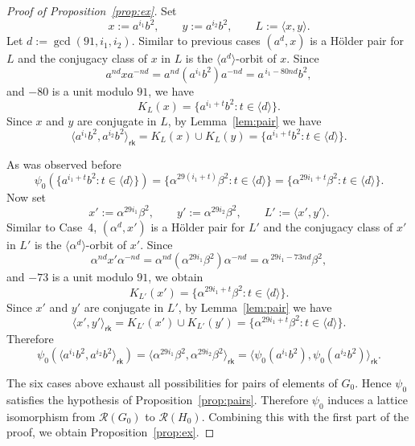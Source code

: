 \documentclass[10pt,a4paper]{amsart}
\begin{document}
\begin{proof}[Proof of Proposition~\ref{prop:ex}]
  \medskip
  Set
  $$ x:=a^{i_1}b^2,\qquad y:=a^{i_2}b^2,\qquad L:=\langle x,y\rangle. $$
  Let $d:=\gcd(91,i_1,i_2)$. Similar to previous cases $(a^d,x)$ is a Hölder pair for $L$ and the conjugacy class of $x$ in $L$ is the $\langle a^d\rangle$-orbit of $x$. Since
  $$ a^{nd}xa^{-nd}=a^{nd}(a^{i_1}b^2)a^{-nd}=a^{\,i_1-80nd}b^2, $$
  and $-80$ is a unit modulo $91$, we have
  $$ K_L(x)=\{a^{i_1+t}b^2:t\in \langle d\rangle\}. $$
  Since $x$ and $y$ are conjugate in $L$, by Lemma~\ref{lem:pair} we have
  $$ \langle a^{i_1}b^2,a^{i_2}b^2\rangle_{\mathsf{rk}} = K_L(x)\cup K_L(y) = \{a^{i_1+t}b^2 : t\in \langle d\rangle\}. $$
  
  As was observed before
  $$ \psi_0(\{a^{i_1+t}b^2:t\in \langle d\rangle\}) = \{\alpha^{29(i_1+t)}\beta^2:t\in \langle d\rangle\} = \{\alpha^{29i_1+t}\beta^2:t\in \langle d\rangle\}. $$
  Now set
  $$ x':=\alpha^{29i_1}\beta^2,\qquad y':=\alpha^{29i_2}\beta^2,\qquad L':=\langle x',y'\rangle. $$
  Similar to Case~4, $(\alpha^d,x')$ is a Hölder pair for $L'$ and the conjugacy class of $x'$ in $L'$ is the $\langle \alpha^d\rangle$-orbit of $x'$. Since
  $$ \alpha^{nd}x'\alpha^{-nd} = \alpha^{nd}(\alpha^{29i_1}\beta^2)\alpha^{-nd} = \alpha^{\,29i_1-73nd}\beta^2, $$
  and $-73$ is a unit modulo $91$, we obtain
  $$ K_{L'}(x')=\{\alpha^{29i_1+t}\beta^2:t\in \langle d\rangle\}. $$
  Since $x'$ and $y'$ are conjugate in $L'$, by Lemma~\ref{lem:pair} we have 
  $$ \langle x',y'\rangle_{\mathsf{rk}} = K_{L'}(x')\cup K_{L'}(y') = \{\alpha^{29i_1+t}\beta^2:t\in \langle d\rangle\}. $$
  Therefore
  $$ \psi_0(\langle a^{i_1}b^2,a^{i_2}b^2\rangle_{\mathsf{rk}}) = \langle \alpha^{29i_1}\beta^2,\alpha^{29i_2}\beta^2\rangle_{\mathsf{rk}} = \langle \psi_0(a^{i_1}b^2),\psi_0(a^{i_2}b^2)\rangle_{\mathsf{rk}}. $$
  
  
  
  \medskip
  The six cases above exhaust all possibilities for pairs of elements of $G_0$. Hence $\psi_0$ satisfies the hypothesis of Proposition~\ref{prop:pairs}. Therefore $\psi_0$ induces a lattice isomorphism from $\mathcal{R}(G_0)$ to $\mathcal{R}(H_0)$. Combining this with the first part of the proof, we obtain Proposition~\ref{prop:ex}.
  
  
\end{proof}
\end{document}

